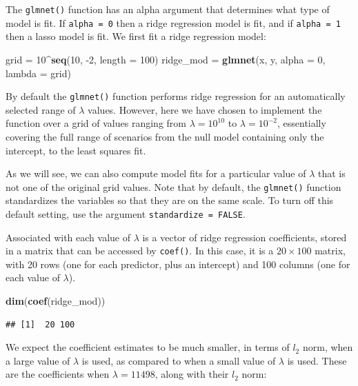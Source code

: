 \documentclass[openany]{book}
\newenvironment{Shaded}{\begin{snugshade}}{\end{snugshade}}
\newcommand{\DataTypeTok}[1]{\textcolor[rgb]{0.13,0.29,0.53}{#1}}
\newcommand{\DecValTok}[1]{\textcolor[rgb]{0.00,0.00,0.81}{#1}}
\newcommand{\KeywordTok}[1]{\textcolor[rgb]{0.13,0.29,0.53}{\textbf{#1}}}
\newcommand{\NormalTok}[1]{#1}
\newcommand{\OperatorTok}[1]{\textcolor[rgb]{0.81,0.36,0.00}{\textbf{#1}}}
\newcommand{\StringTok}[1]{\textcolor[rgb]{0.31,0.60,0.02}{#1}}
\begin{document}
The \texttt{glmnet()} function has an alpha argument that determines what type
of model is fit. If \texttt{alpha\ =\ 0} then a ridge regression model is fit, and if \texttt{alpha\ =\ 1}
then a lasso model is fit. We first fit a ridge regression model:

\begin{Shaded}
\begin{Highlighting}[]
\NormalTok{grid =}\StringTok{ }\DecValTok{10}\OperatorTok{^}\KeywordTok{seq}\NormalTok{(}\DecValTok{10}\NormalTok{, }\DecValTok{-2}\NormalTok{, }\DataTypeTok{length =} \DecValTok{100}\NormalTok{)}
\NormalTok{ridge_mod =}\StringTok{ }\KeywordTok{glmnet}\NormalTok{(x, y, }\DataTypeTok{alpha =} \DecValTok{0}\NormalTok{, }\DataTypeTok{lambda =}\NormalTok{ grid)}
\end{Highlighting}
\end{Shaded}

By default the \texttt{glmnet()} function performs ridge regression for an automatically
selected range of \(\lambda\) values. However, here we have chosen to implement
the function over a grid of values ranging from \(\lambda = 10^10\) to \(\lambda = 10^{-2}\), essentially covering the full range of scenarios from the null model containing
only the intercept, to the least squares fit.

As we will see, we can also compute
model fits for a particular value of \(\lambda\) that is not one of the original
grid values. Note that by default, the \texttt{glmnet()} function standardizes the
variables so that they are on the same scale. To turn off this default setting,
use the argument \texttt{standardize\ =\ FALSE}.

Associated with each value of \(\lambda\) is a vector of ridge regression coefficients,
stored in a matrix that can be accessed by \texttt{coef()}. In this case, it is a \(20 \times 100\)
matrix, with 20 rows (one for each predictor, plus an intercept) and 100
columns (one for each value of \(\lambda\)).

\begin{Shaded}
\begin{Highlighting}[]
\KeywordTok{dim}\NormalTok{(}\KeywordTok{coef}\NormalTok{(ridge_mod))}
\end{Highlighting}
\end{Shaded}

\begin{verbatim}
## [1]  20 100
\end{verbatim}

We expect the coefficient estimates to be much smaller, in terms of \(l_2\) norm,
when a large value of \(\lambda\) is used, as compared to when a small value of \(\lambda\) is
used. These are the coefficients when \(\lambda = 11498\), along with their \(l_2\) norm:
\end{document}
